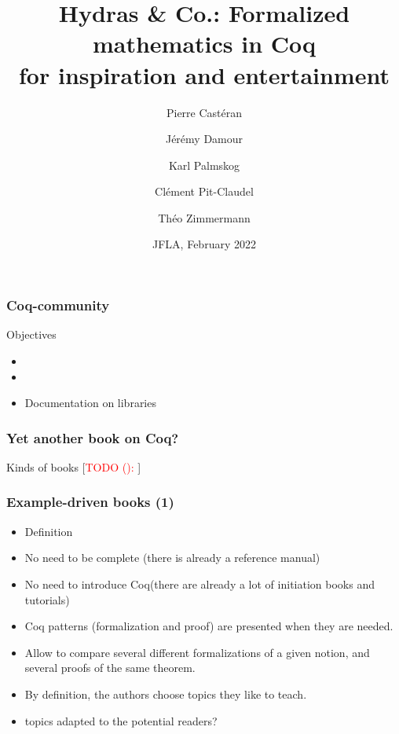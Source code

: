 \documentclass[10pt]{beamer}
\title{Hydras \& Co.: Formalized mathematics in Coq\\
 for inspiration and entertainment
}
\date{JFLA, February 2022}
\author{
Pierre Castéran \inst{1}
\and
    Jérémy Damour \inst{2}
\and
Karl Palmskog \inst{3}
\and Clément Pit-Claudel \inst{4}
\and Théo Zimmermann \inst{5}
}
\institute{
Univ. Bordeaux, CNRS, Bordeaux INP, LaBRI, UMR 5800, F-33400 Talence, France  %
\and
Univ. de Paris, F-75013 Paris, France
\and
KTH Royal Institute of Technology, Stockholm, Sweden
\and
MIT CSAIL, Cambridge, Massachusetts, USA
\and
Inria, Univ. de Paris, CNRS, IRIF, UMR 8243, F-75013 Paris, France
}
\newcommand{\TODO}[2][]{[\textcolor{red}{TODO (#1):} \emph{#2}]}
\newcommand{\coq}{Coq\xspace}
\begin{document}
\begin{frame}
  \maketitle
\end{frame}
\begin{frame}
  \frametitle{Coq-community}
  \begin{block}{Objectives}
    \begin{itemize}
    \item \TODO{}{}
    \item\TODO{}{}
      \item Documentation on libraries
    \end{itemize}
  \end{block}
\end{frame}
\begin{frame}
  \frametitle{Yet another book on \coq?}
  \begin{block}{Kinds of books}
    \TODO{}{}
  \end{block}
\end{frame}
\begin{frame}
  \frametitle{Example-driven books (1)}
  \begin{block}{}
    \begin{itemize}
    \item \TODO{}{Definition}
    \item No need to be complete (there is already a reference manual)
      \item No need to introduce \coq (there are already a lot of initiation books and tutorials)
    \item \coq patterns (formalization and proof) are presented  when they are needed.
    \item Allow to compare several different formalizations of a given notion, and several proofs of the same theorem.
    \item By definition, the authors choose topics they like to teach.
      \item \TODO{}{topics adapted to the potential readers?}
    \end{itemize}
  \end{block}
\end{frame}
\end{document}
